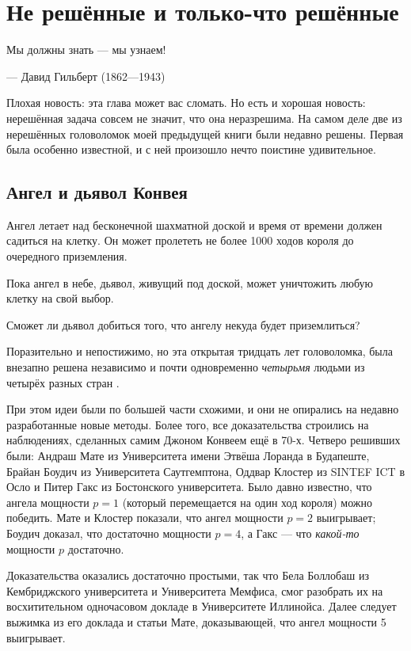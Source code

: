 \chapter{Не решённые и только-что решённые}


\setlength{\epigraphwidth}{.80\textwidth}
\epigraph{Мы должны знать --- мы узнаем!
}{--- Давид Гильберт (1862---1943)}

Плохая новость: эта глава может вас сломать.
Но есть и хорошая новость: нерешённая задача совсем не значит, что она неразрешима.
На самом деле две из нерешённых головоломок моей предыдущей книги были недавно решены.
Первая была особенно известной, и с ней произошло нечто поистине удивительное.

\section*{Ангел и дьявол Конвея}

Ангел летает над бесконечной шахматной доской и время от времени
должен садиться на клетку.
Он может пролететь не более 1000 ходов
короля до очередного приземления.

Пока ангел в небе, дьявол, живущий под доской, может уничтожить любую клетку на свой выбор.

Сможет ли дьявол добиться того, что ангелу некуда будет приземлиться?

\medskip

Поразительно и непостижимо, но эта открытая тридцать лет головоломка, была внезапно решена
независимо и почти одновременно
\emph{четырьмя} людьми из четырёх разных стран \cite{10, 20, 40, 43}.

При этом идеи были по большей части схожими, и они не опирались на недавно разработанные новые методы.
Более того, все доказательства строились на наблюдениях, сделанных самим Джоном Конвеем ещё в 70-х.
Четверо решивших были:
Андраш Мате из Университета имени Этвёша Лоранда в Будапеште,
Брайан Боудич из Университета Саутгемптона,
Оддвар Клостер из SINTEF ICT в Осло
и Питер Гакс из Бостонского университета.
Было давно известно, что ангела мощности $p=1$ (который перемещается на один ход короля) можно победить.
Мате и Клостер показали, что ангел мощности $p=2$ выигрывает;
Боудич доказал, что достаточно мощности $p=4$,
а Гакс --- что \emph{какой-то} мощности $p$ достаточно.

Доказательства оказались достаточно простыми, так что Бела Боллобаш из Кембриджского университета и Университета Мемфиса, смог разобрать их на восхитительном одночасовом докладе в Университете Иллинойса.
Далее следует выжимка из его доклада и статьи Мате, доказывающей, что ангел мощности 5 выигрывает.

